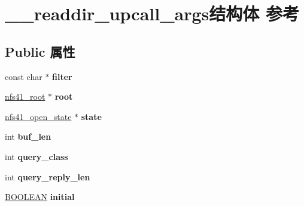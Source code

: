 \hypertarget{struct____readdir__upcall__args}{}\section{\+\_\+\+\_\+readdir\+\_\+upcall\+\_\+args结构体 参考}
\label{struct____readdir__upcall__args}
\subsection*{Public 属性}
\begin{DoxyCompactItemize}
\item 
\mbox{\label{struct____readdir__upcall__args_ab4b46775a4d4f702c3c4dac8cded4209}} 
const char $\ast$ {\bfseries filter}
\item 
\mbox{\label{struct____readdir__upcall__args_afefc7357cb47eeec616add9a405ca5ea}} 
\hyperlink{struct____nfs41__root}{nfs41\+\_\+root} $\ast$ {\bfseries root}
\item 
\mbox{\label{struct____readdir__upcall__args_a63ea5f473e4a7a4bb168513e530d329a}} 
\hyperlink{struct____nfs41__open__state}{nfs41\+\_\+open\+\_\+state} $\ast$ {\bfseries state}
\item 
\mbox{\label{struct____readdir__upcall__args_aa2480777cbbb2a3170e2498090dfa1a3}} 
int {\bfseries buf\+\_\+len}
\item 
\mbox{\label{struct____readdir__upcall__args_a2a75bcca5f00d5ad3b7bf24435610d44}} 
int {\bfseries query\+\_\+class}
\item 
\mbox{\label{struct____readdir__upcall__args_af806f68b44d57119cb1bc046a6727260}} 
int {\bfseries query\+\_\+reply\+\_\+len}
\item 
\mbox{\label{struct____readdir__upcall__args_af2d76d62017aa761a05e91c2e60bfca6}} 
\hyperlink{_processor_bind_8h_a112e3146cb38b6ee95e64d85842e380a}{B\+O\+O\+L\+E\+AN} {\bfseries initial}
\item 
\mbox{\label{struct____readdir__upcall__args_a104bf63f43b4eb2618dcb61edd0717b1}} 

\end{DoxyCompactItemize}
